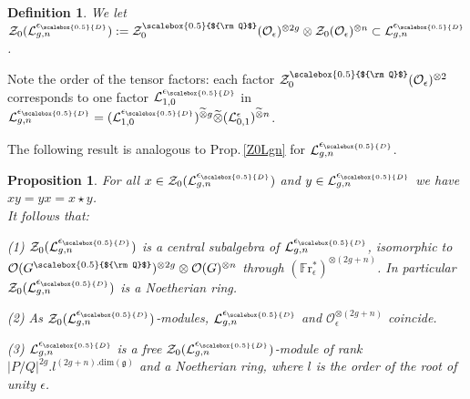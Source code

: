 \documentclass[11pt]{amsart}
\newtheorem{prop}[teo]{Proposition}
\newtheorem{defi}[teo]{Definition}
\newcommand{\e}{\epsilon}
\newcommand{\Ll}{\mathcal{L}}
\newcommand{\Oo}{\mathcal{O}}
\newcommand{\eD}{\epsilon_{\scalebox{0.5}{D}}}
\newcommand{\Q}{{\scalebox{0.5}{${\rm Q}$}}}
\begin{document}
\begin{defi}\label{defZ0gnoct24} We let $\mathcal{Z}_0(\Ll_{g,n}^{\eD})  := \mathcal{Z}_0^{\Q}(\Oo_{\e})^{\otimes 2g}\otimes \mathcal{Z}_0(\Oo_{\e})^{\otimes n} \subset \Ll_{g,n}^{\eD}$.
\end{defi}
Note the order of the tensor factors: each factor $\mathcal{Z}_0^{\Q}(\Oo_{\e})^{\otimes 2}$ corresponds to one factor $\mathcal{L}_{1,0}^{\eD}$ in $\mathcal{L}_{g,n}^{\eD}=(\mathcal{L}_{1,0}^{\eD})^{\widetilde{\otimes }g}\widetilde{\otimes} (\mathcal{L}_{0,1}^\e)^{\widetilde{\otimes} n}$.

The following result is analogous to Prop.\,\ref{Z0Lgn} for $\Ll_{g,n}^{\eD}$.
\begin{prop}\label{Z0LgneD} \label{Z0L0n} For all $x \in \mathcal{Z}_0(\mathcal{L}_{g,n}^{\eD})$ and $y \in \mathcal{L}_{g,n}^{\eD}$ we have $xy = yx = x \star y$.
\\It follows that:

\noindent (1) $\mathcal{Z}_0(\Ll_{g,n}^{\eD})$ is a central subalgebra of $\Ll_{g,n}^{\eD}$, isomorphic to $\Oo(G^\Q)^{\otimes 2g}\otimes \Oo(G)^{\otimes n}$ through $(\mathbb{F}\mathrm{r}_\e^{*})^{\otimes (2g+n)}$. In particular $\mathcal{Z}_0(\Ll_{g,n}^{\eD})$ is a Noetherian ring.

\noindent (2) As $\mathcal{Z}_0(\Ll_{g,n}^{\eD})$-modules, $\Ll_{g,n}^{\eD}$ and $\Oo_{\e}^{\otimes (2g+n)}$ coincide.

\noindent (3) $\Ll_{g,n}^{\eD}$ is a free $\mathcal{Z}_0(\Ll_{g,n}^{\eD})$-module of rank $\vert P/Q\vert^{2g}.l^{(2g+n).\mathrm{dim}(\mathfrak{g})}$ and a Noetherian ring, where $l$ is the order of the root of unity $\e$.
\end{prop}
\end{document}
